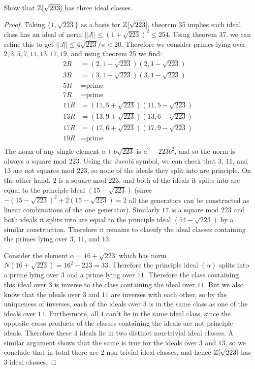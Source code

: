 \documentclass[11pt]{article}
\begin{document}
Show that $\mathbb{Z}[\sqrt{233}]$ has three ideal classes.
\begin{proof}
  Taking $\{1,\sqrt{223}\}$ as a basis for $\mathbb{Z}[\sqrt{223}]$, theorem 35 implies each ideal class has an ideal of norm $||J|| \le (1 + \sqrt{223})^2 \le 254$. Using theorem 37, we can refine this to get $||J|| \le 4\sqrt{223}/\pi < 20$. Therefore we consider primes lying over $2,3,5,7,11,13,17,19$, and using theorem 25 we find:
  \begin{align*}
    2R &= (2, 1+\sqrt{223})(2, 1-\sqrt{223}) \\
    3R &= (3, 1+\sqrt{223})(3, 1-\sqrt{223}) \\
    5R &= \text{prime} \\
    7R &= \text{prime} \\
    11R &= (11, 5+\sqrt{223})(11, 5-\sqrt{223}) \\
    13R &= (13, 9+\sqrt{223})(13, 6-\sqrt{223}) \\
    17R &= (17, 6+\sqrt{223})(17, 9-\sqrt{223}) \\
    19R &= \text{prime} \\
  \end{align*}
  The norm of any single element $a + b\sqrt{223}$ is $a^2 - 223b^2$, and so the norm is always a square mod $223$.
  Using the Jacobi symbol, we can check that $3$, $11$, and $13$ are not squares mod $223$, so none of the ideals they split into are principle.
  On the other hand, $2$ is a square mod $223$, and both of the ideals it splits into are equal to the principle ideal $(15 - \sqrt{223})$ (since $-(15 - \sqrt{223})^2 + 2(15 - \sqrt{223}) = 2$ all the generators can be constructed as linear combinations of the one generator).
  Similarly $17$ is a square mod $223$ and both ideals it splits into are equal to the principle ideal $(54 - \sqrt{223})$ by a similar construction.
  Therefore it remains to classify the ideal classes containing the primes lying over $3$, $11$, and $13$.
  
  Consider the element $\alpha = 16 + \sqrt{223}$ which has norm $N(16 + \sqrt{223}) = 16^2 - 223 = 33$.
  Therefore the principle ideal $(\alpha)$ splits into a prime lying over $3$ and a prime lying over $11$.
  Therefore the class containing this ideal over $3$ is inverse to the class containing the ideal over $11$.
  But we also know that the ideals over $3$ and $11$ are inverses with each other, so by the uniqueness of inverses, each of the ideals over $3$ is in the same class as one of the ideals over $11$.
  Furthermore, all $4$ can't lie in the same ideal class, since the opposite cross products of the classes containing the ideals are not principle ideals.
  Therefore these $4$ ideals lie in two distinct non-trivial ideal classes.
  A similar argument shows that the same is true for the ideals over $3$ and $13$, so we conclude that in total there are 2 non-trivial ideal classes, and hence $\mathbb{Z}[\sqrt{223}]$ has 3 ideal classes.
\end{proof}
\end{document}
